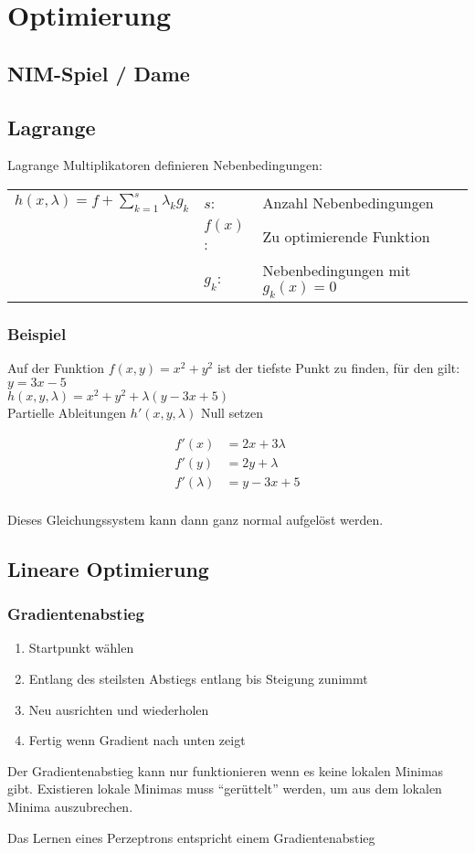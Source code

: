 \section{Optimierung}
\subsection{NIM-Spiel / Dame}

\subsection{Lagrange}
Lagrange Multiplikatoren definieren Nebenbedingungen:\\
\begin{tabular}{l l l}
	{$ h(x,\lambda) = f + \sum\limits_{k=1}^s{\lambda_k g_k} $ } &
		$s$:    &Anzahl Nebenbedingungen \\
		&$f(x)$:&Zu optimierende Funktion \\
		&$g_k$: &Nebenbedingungen mit $g_k(x) = 0$
\end{tabular}
\subsubsection{Beispiel}
Auf der Funktion $f(x,y) = x^2 + y^2$ ist der tiefste Punkt zu finden,
für den gilt: $y = 3x - 5$ \\
$ h(x,y,\lambda) = x^2 + y^2 + \lambda(y - 3x + 5) $ \\
Partielle Ableitungen $h'(x,y,\lambda)$ Null setzen

\begin{align}
	f'(x)& = 2 x + 3 \lambda \\
	f'(y)& = 2 y + \lambda \\
	f'(\lambda)& = y - 3x + 5 \\
\end{align}

Dieses Gleichungssystem kann dann ganz normal aufgelöst werden.

\subsection{Lineare Optimierung}
\subsubsection{Gradientenabstieg}
\begin{enumerate}
	\item Startpunkt wählen
	\item Entlang des steilsten Abstiegs entlang bis Steigung zunimmt
	\item Neu ausrichten und wiederholen
	\item Fertig wenn Gradient nach unten zeigt
\end{enumerate}
Der Gradientenabstieg kann nur funktionieren wenn es keine lokalen
Minimas gibt. Existieren lokale Minimas muss ``gerüttelt'' werden, um
aus dem lokalen Minima auszubrechen.

Das Lernen eines Perzeptrons entspricht einem Gradientenabstieg

